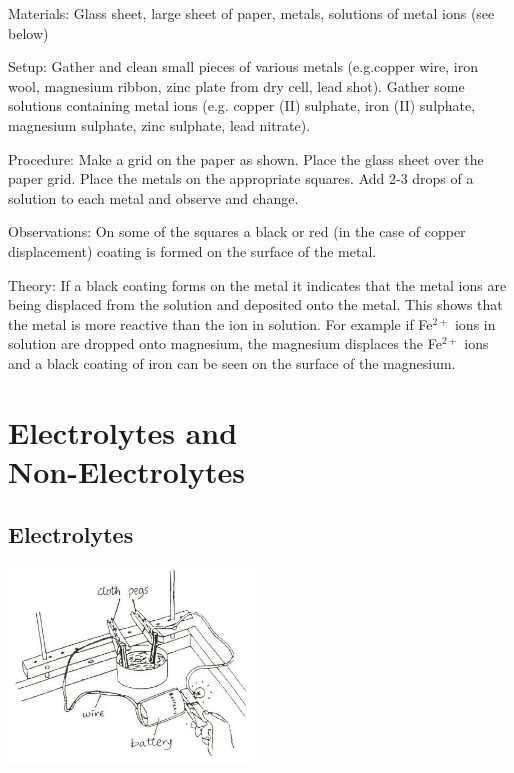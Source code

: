 \begin{multicols}{2}
\begin{description*}
\item[Materials:]{Glass sheet, large sheet of paper, metals, solutions of metal ions (see below)}
\item[Setup:]{Gather and clean small pieces of various metals (e.g.copper wire, iron wool, magnesium ribbon, zinc plate from dry cell, lead shot). Gather some solutions containing metal ions (e.g. copper (II) sulphate, iron (II) sulphate, magnesium sulphate, zinc sulphate, lead nitrate).}
\item[Procedure:]{Make a grid on the paper as shown. Place the glass sheet over the paper grid. Place the metals on the appropriate squares. Add 2-3 drops of a solution to each metal and observe and change.}
\item[Observations:]{On some of the squares a black or red (in the
case of copper displacement) coating is formed
on the surface of the metal.}
\item[Theory:]{If a black coating forms on the metal it indicates that the metal ions are being displaced from the solution and deposited onto the metal. This shows that the metal is more reactive than the ion in solution. For example if Fe$^{2+}$ ions in
solution are dropped onto magnesium, the
magnesium displaces the Fe$^{2+}$ ions and a black
coating of iron can be seen on the surface of the
magnesium.}
\end{description*}

\columnbreak


\section*{Electrolytes and \hfill \\ Non-Electrolytes}


\subsection{Electrolytes}

\begin{center}
\includegraphics[width=0.49\textwidth]{./img/source/electrolytes.jpg}
\end{center}


\end{multicols}
